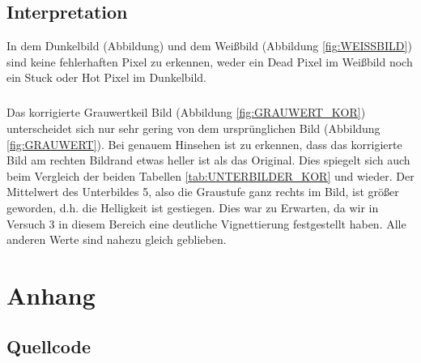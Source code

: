 \documentclass[12pt,oneside,a4paper]{report}
\begin{document}
\section{Interpretation}
\label{chap:VERSUCH_4_INTERPRETATION}

In dem Dunkelbild (Abbildung) und dem Weißbild (Abbildung \ref{fig:WEISSBILD}) sind keine fehlerhaften Pixel zu erkennen, weder ein Dead Pixel im Weißbild noch ein Stuck oder Hot Pixel im Dunkelbild.

\paragraph{}
Das korrigierte Grauwertkeil Bild (Abbildung \ref{fig:GRAUWERT_KOR}) unterscheidet sich nur sehr gering von dem ursprünglichen Bild (Abbildung \ref{fig:GRAUWERT}). Bei genauem Hinsehen ist zu erkennen, dass das korrigierte Bild am rechten Bildrand etwas heller ist als das Original. Dies spiegelt sich auch beim Vergleich der beiden Tabellen \ref{tab:UNTERBILDER_KOR} und wieder. Der Mittelwert des Unterbildes 5, also die Graustufe ganz rechts im Bild, ist größer geworden, d.h. die Helligkeit ist gestiegen.
Dies war zu Erwarten, da wir in Versuch 3 in diesem Bereich eine deutliche Vignettierung festgestellt haben. Alle anderen Werte sind nahezu gleich geblieben.
%
%
\renewcommand\thesection{A.\arabic{section}}
\renewcommand\thesubsection{\thesection.\arabic{subsection}}

\chapter*{Anhang}
\label{chap:APPENDIX}
\addtocounter{chapter}{1}
\setcounter{section}{0}

\section{Quellcode}
\label{chap:APPENDIX_SOURCECODE}
\end{document}
